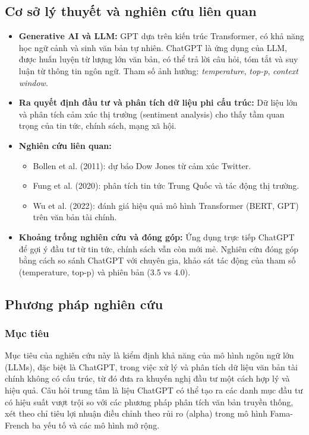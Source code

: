 \documentclass[a4paper,12pt]{article}
\begin{document}
\subsection{Cơ sở lý thuyết và nghiên cứu liên quan}
\begin{itemize}
    \item \textbf{Generative AI và LLM:} GPT dựa trên kiến trúc Transformer, có khả năng học ngữ cảnh và sinh văn bản tự nhiên. ChatGPT là ứng dụng của LLM, được huấn luyện từ lượng lớn văn bản, có thể trả lời câu hỏi, tóm tắt và suy luận từ thông tin ngôn ngữ. Tham số ảnh hưởng: \textit{temperature}, \textit{top-p}, \textit{context window}.
    \item \textbf{Ra quyết định đầu tư và phân tích dữ liệu phi cấu trúc:} Dữ liệu lớn và phân tích cảm xúc thị trường (sentiment analysis) cho thấy tầm quan trọng của tin tức, chính sách, mạng xã hội.
    \item \textbf{Nghiên cứu liên quan:}
    \begin{itemize}
        \item Bollen et al. (2011): dự báo Dow Jones từ cảm xúc Twitter.
        \item Fung et al. (2020): phân tích tin tức Trung Quốc và tác động thị trường.
        \item Wu et al. (2022): đánh giá hiệu quả mô hình Transformer (BERT, GPT) trên văn bản tài chính.
    \end{itemize}
    \item \textbf{Khoảng trống nghiên cứu và đóng góp:} Ứng dụng trực tiếp ChatGPT để gợi ý đầu tư từ tin tức, chính sách vẫn còn mới mẻ. Nghiên cứu đóng góp bằng cách so sánh ChatGPT với chuyên gia, khảo sát tác động của tham số (temperature, top-p) và phiên bản (3.5 vs 4.0).
\end{itemize}

\subsection{Phương pháp nghiên cứu}

\subsubsection{Mục tiêu}
Mục tiêu của nghiên cứu này là kiểm định khả năng của mô hình ngôn ngữ lớn (LLMs), đặc biệt là ChatGPT, trong việc xử lý và phân tích dữ liệu văn bản tài chính không có cấu trúc, từ đó đưa ra khuyến nghị đầu tư một cách hợp lý và hiệu quả. Câu hỏi trung tâm là liệu ChatGPT có thể tạo ra các danh mục đầu tư có hiệu suất vượt trội so với các phương pháp phân tích văn bản truyền thống, xét theo chỉ tiêu lợi nhuận điều chỉnh theo rủi ro (alpha) trong mô hình Fama-French ba yếu tố và các mô hình mở rộng.
\end{document}
